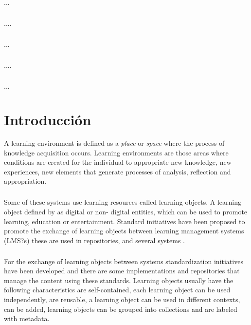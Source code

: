 \documentclass[12pt,letterpaper,oneside] {memoir}
\begin{document}
\paragraph{}
...
\paragraph{}
....
\paragraph{}
...
\paragraph{}
....
\paragraph{}
...
\clearpage

\tableofcontents* 
\clearpage
\listoffigures
\clearpage
\listoftables
\mainmatter

\chapter{Introducción}

A learning environment is defined as a \textit{place} or \textit{space} where the process of knowledge acquisition occurs. Learning environments are those areas where conditions are created for the individual to appropriate new knowledge, new experiences, new elements that generate processes of analysis, reflection and appropriation.  
\paragraph{}
Some of these systems use learning resources called learning objects. A learning object defined by \cite{Willey 2000} as digital or non- digital entities, which can be used to promote learning, education or entertainment. Standard initiatives have been proposed to promote the exchange of learning objects between learning management systems (LMS?s) these are used in repositories, and several systems \cite{LMS 2}.   
\paragraph{}
For the exchange of learning objects between systems standardization initiatives have been developed and there are some implementations and repositories that manage the content using these standards. Learning objects usually have the following characteristics are self-contained, each learning object can be used independently, are reusable, a learning object can be used in different contexts, can be added, learning objects can be grouped into collections and are labeled with metadata.   
\end{document}

